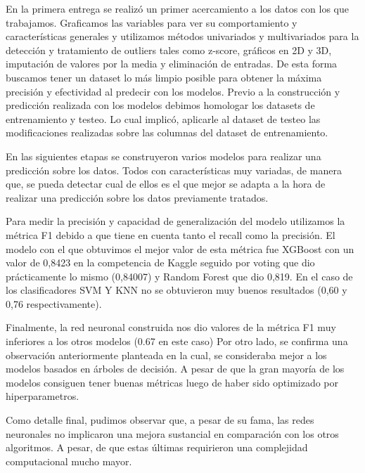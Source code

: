 \documentclass{article}
\begin{document}
En la primera entrega se realizó un primer acercamiento a los datos con los que trabajamos. Graficamos las variables para ver su comportamiento y características generales y utilizamos métodos univariados y multivariados para la detección y tratamiento de outliers tales como z-score, gráficos en 2D y 3D, imputación de valores por la media y eliminación de entradas. De esta forma buscamos tener un dataset lo más limpio posible para obtener la máxima precisión y efectividad al predecir con los modelos. 
Previo a la construcción y predicción realizada con los modelos debimos homologar los datasets de entrenamiento y testeo. Lo cual implicó, aplicarle al dataset de testeo las modificaciones realizadas sobre las columnas del dataset de entrenamiento.

En las siguientes etapas se construyeron varios modelos para realizar una predicción sobre los datos. Todos con características muy variadas, de manera que, se pueda detectar cual de ellos es el que mejor se adapta a la hora de realizar una predicción sobre los datos previamente tratados.

Para medir la precisión y capacidad de generalización del modelo utilizamos la métrica F1 debido a que tiene en cuenta tanto el recall como la precisión. El modelo con el que obtuvimos el mejor valor de esta métrica fue XGBoost con un valor de 0,8423 en la competencia de Kaggle seguido por voting que dio prácticamente lo mismo (0,84007) y Random Forest que dio 0,819. 
En el caso de los clasificadores SVM Y KNN no se obtuvieron muy buenos resultados (0,60 y 0,76 respectivamente).

Finalmente, la red neuronal construida nos dio valores de la métrica F1 muy inferiores a los otros modelos (0.67 en este caso)  
Por otro lado, se confirma una observación anteriormente planteada en la cual, se consideraba mejor a los modelos basados en árboles de decisión. A pesar de que la gran mayoría de los modelos consiguen tener buenas métricas luego de haber sido optimizado por hiperparametros. 

Como detalle final, pudimos observar que, a pesar de su fama, las redes neuronales no implicaron una mejora sustancial en comparación con los otros algoritmos. A pesar, de que estas últimas requirieron una complejidad computacional mucho mayor. 
\end{document}
